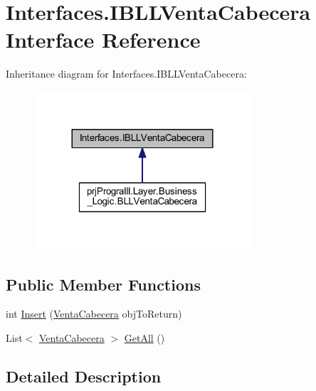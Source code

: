 \hypertarget{interface_interfaces_1_1_i_b_l_l_venta_cabecera}{}\section{Interfaces.\+I\+B\+L\+L\+Venta\+Cabecera Interface Reference}
\label{interface_interfaces_1_1_i_b_l_l_venta_cabecera}


Inheritance diagram for Interfaces.\+I\+B\+L\+L\+Venta\+Cabecera\+:
\nopagebreak
\begin{figure}[H]
\begin{center}
\leavevmode
\includegraphics[width=228pt]{interface_interfaces_1_1_i_b_l_l_venta_cabecera__inherit__graph}
\end{center}
\end{figure}
\subsection*{Public Member Functions}
\begin{DoxyCompactItemize}
\item 
int \hyperlink{interface_interfaces_1_1_i_b_l_l_venta_cabecera_a28aab27efa8b0bfbac32d24d814e7a76}{Insert} (\hyperlink{classprj_progra_i_i_i_1_1_layer_1_1_entities_1_1_venta_cabecera}{Venta\+Cabecera} obj\+To\+Return)
\item 
List$<$ \hyperlink{classprj_progra_i_i_i_1_1_layer_1_1_entities_1_1_venta_cabecera}{Venta\+Cabecera} $>$ \hyperlink{interface_interfaces_1_1_i_b_l_l_venta_cabecera_ae3e14c66210f1065c4633869c97a0efd}{Get\+All} ()
\end{DoxyCompactItemize}


\subsection{Detailed Description}


